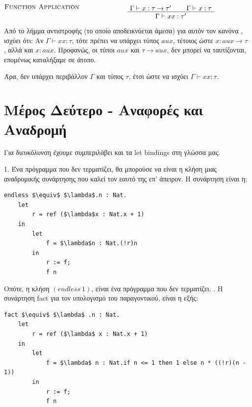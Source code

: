 \documentclass[a4paper, 11pt, twoside]{article}
\begin{document}
\begin{otherlanguage}{english}

\[
\begin{tabular}{@{} l >{\centering\arraybackslash}m{.7\textwidth} @{}}
\textsc{Function Application} &
  \begin{prooftree}
  \AxiomC{$\Gamma \vdash x : \tau \rightarrow \tau '$}
  \AxiomC{$\Gamma \vdash x : \tau $}
  \BinaryInfC{$\Gamma \vdash x x: \tau '$}
  \end{prooftree}
\\

\end{tabular}
\]
\end{otherlanguage}

Από το λήμμα αντιστροφής (το οποίο αποδεικνύεται άμεσα) για αυτόν τον κανόνα , ισχύει ότι: Αν $\Gamma \vdash x x: \tau$, τότε πρέπει να υπάρχει τύπος $aux$, τέτοιος ώστε $x : aux \rightarrow \tau$ , αλλά και $x : aux$. Προφανώς, οι τύποι $aux$ και $\tau \rightarrow aux$, δεν μπορεί να ταυτίζονται, επομένως καταλήξαμε σε άτοπο.

Άρα, δεν υπάρχει περιβάλλον $\Gamma$ και τύπος $\tau$, έτσι ώστε να ισχύει $\Gamma \vdash xx : \tau$.

\section*{Μέρος Δεύτερο - Αναφορές και Αναδρομή}
Για διευκόλυνση έχουμε συμπεριλάβει και τα \textlatin{let bindings} στη γλώσσα μας.

1. Ένα πρόγραμμα που δεν τερματίζει, θα μπορούσε να είναι η κλήση μιας αναδρομικής συνάρτησης που καλεί τον εαυτό της επ' άπειρον. Η συνάρτηση είναι η:

\begin{otherlanguage}{english}
\begin{lstlisting}
endless $\equiv$ $\lambda$.n : Nat.
    let 
        r = ref ($\lambda$x : Nat.x + 1)
    in
        let
            f = $\lambda$n : Nat.(!r)n
        in
            r := f;
            f n
\end{lstlisting}
\end{otherlanguage}

Οπότε, η κλήση $(endless~1)$, είναι ένα πρόγραμμα που δεν τερματίζει.
. Η συνάρτηση \textlatin{fact} για τον υπολογισμό του παραγοντικού, είναι η εξής:

\begin{otherlanguage}{english}
\begin{lstlisting}
fact $\equiv$ $\lambda$ .n : Nat.
    let 
        r = ref ($\lambda$ x : Nat.x + 1)
    in
        let
            f = $\lambda$ n : Nat.if n <= 1 then 1 else n * ((!r)(n - 1))
        in
            r := f;
            f n 
\end{lstlisting}
\end{otherlanguage}
\end{document}
